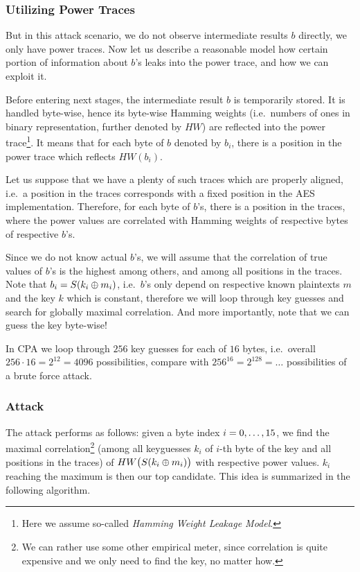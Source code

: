 \subsubsection{Utilizing Power Traces}
	
	But in this attack scenario, we do not observe intermediate results $b$ directly, we only have power traces. Now let us describe a reasonable model how certain portion of information about $b$'s leaks into the power trace, and how we can exploit it.
	
	Before entering next stages, the intermediate result $b$ is temporarily stored. It is handled byte-wise, hence its byte-wise Hamming weights (i.e.\ numbers of ones in binary representation, further denoted by $HW$) are reflected into the power trace\footnote{Here we assume so-called {\em Hamming Weight Leakage Model}.}. It means that for each byte of $b$ denoted by $b_i$, there is a position in the power trace which reflects $HW(b_i)$.
	
	Let us suppose that we have a plenty of such traces which are properly aligned, i.e.\ a position in the traces corresponds with a fixed position in the AES implementation. Therefore, for each byte of $b$'s, there is a position in the traces, where the power values are correlated with Hamming weights of respective bytes of respective $b$'s.
	
	Since we do not know actual $b$'s, we will assume that the correlation of true values of $b$'s is the highest among others, and among all positions in the traces. Note that $b_i = S(k_i\oplus m_i)$, i.e.\ $b$'s only depend on respective known plaintexts $m$ and the key $k$ which is constant, therefore we will loop through key guesses and search for globally maximal correlation. And more importantly, note that we can guess the key byte-wise!
	
	\begin{note}
	\label{note:brutevssca}
		In CPA we loop through $256$ key guesses for each of $16$ bytes, i.e.\ overall $256\cdot 16 = 2^{12} = 4096$ possibilities, compare with $256^{16} = 2^{128} = \ldots$ possibilities of a brute force attack.
	\end{note}

\subsubsection{Attack}
	
	The attack performs as follows: given a byte index $i=0 , \ldots , 15$, we find the maximal correlation\footnote{We can rather use some other empirical meter, since correlation is quite expensive and we only need to find the key, no matter how.} (among all keyguesses $k_i$ of $i$-th byte of the key and all positions in the traces) of $HW\bigl(S(k_i\oplus m_i)\bigr)$ with respective power values. $k_i$ reaching the maximum is then our top candidate. This idea is summarized in the following algorithm.
	
